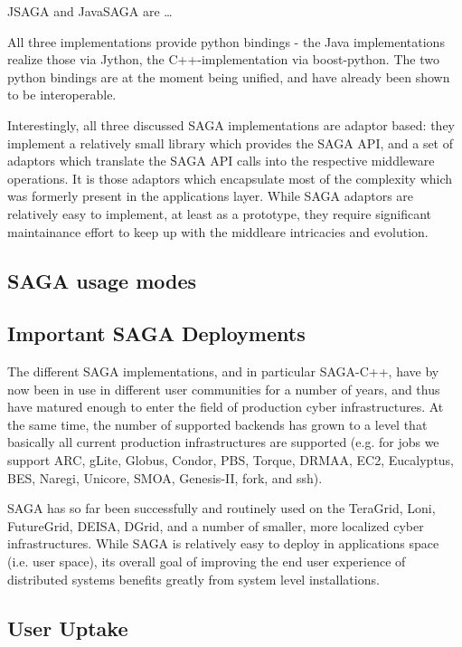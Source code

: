\documentclass[3p,twocolumn]{article}
\begin{document}
  JSAGA and JavaSAGA are …

  All three implementations provide python bindings - the Java
  implementations realize those via Jython, the C++-implementation via
  boost-python.  The two python bindings are at the moment being
  unified, and have already been shown to be interoperable.

  Interestingly, all three discussed SAGA implementations are adaptor
  based: they implement a relatively small library which provides the
  SAGA API, and a set of adaptors which translate the SAGA API calls
  into the respective middleware operations.  It is those adaptors
  which encapsulate most of the complexity which was formerly present
  in the applications layer.  While SAGA adaptors are relatively easy
  to implement, at least as a prototype, they require significant
  maintainance effort to keep up with the middleare intricacies and
  evolution.


 \subsection{SAGA usage modes}

 \subsection{Important SAGA Deployments}

  The different SAGA implementations, and in particular SAGA-C++, have
  by now been in use in different user communities for a number of
  years, and thus have matured enough to enter the  field of
  production cyber infrastructures.  At the same time, the number of
  supported backends has grown to a level that basically all current
  production infrastructures are supported (e.g. for jobs we support
  ARC, gLite, Globus, Condor, PBS, Torque, DRMAA, EC2, Eucalyptus,
  BES,  Naregi, Unicore, SMOA, Genesis-II, fork, and ssh).  

  SAGA has so far been successfully and routinely used on the
  TeraGrid, Loni, FutureGrid, DEISA, DGrid, and a number of smaller,
  more localized cyber infrastructures.  While SAGA is relatively easy to deploy
  in applications space (i.e. user space), its overall goal of improving the end
  user experience of distributed systems benefits greatly from system level
  installations.


 \subsection{User Uptake}
\end{document}
